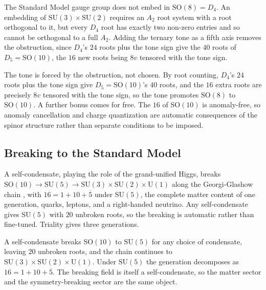 \begin{proposition}
The Standard Model gauge group does not embed in $\mathrm{SO}(8) = D_4$. An embedding of
$\mathrm{SU}(3) \times \mathrm{SU}(2)$ requires an $A_2$ root system with a root orthogonal to it, but every
$D_4$ root has exactly two non-zero entries and so cannot be orthogonal to a full $A_2$. Adding the ternary tone
as a fifth axis removes the obstruction, since $D_4$'s $24$ roots plus the tone sign give the $40$ roots of
$D_5 = \mathrm{SO}(10)$, the $16$ new roots being $8v$ tensored with the tone sign.
\end{proposition}

The tone is forced by the obstruction, not chosen. By root counting, $D_4$'s $24$ roots plus the tone sign give
$D_5 = \mathrm{SO}(10)$'s $40$ roots, and the $16$ extra roots are precisely $8v$ tensored with the tone sign, so
the tone promotes $\mathrm{SO}(8)$ to $\mathrm{SO}(10)$. A further bonus comes for free. The $16$ of
$\mathrm{SO}(10)$ is anomaly-free, so anomaly cancellation and charge quantization are automatic consequences of
the spinor structure rather than separate conditions to be imposed.

\subsection{Breaking to the Standard Model}

A self-condensate, playing the role of the grand-unified Higgs, breaks
$\mathrm{SO}(10) \to \mathrm{SU}(5) \to \mathrm{SU}(3) \times \mathrm{SU}(2) \times \mathrm{U}(1)$ along the
Georgi-Glashow chain \cite{georgiglashow1974, fritzschminkowski1975}, with $16 = 1 + 10 + \overline{5}$ under
$\mathrm{SU}(5)$, the complete matter content of one generation, quarks, leptons, and a right-handed neutrino.
Any self-condensate gives $\mathrm{SU}(5)$ with $20$ unbroken roots, so the breaking is automatic rather than
fine-tuned. Triality gives three generations.

\begin{proposition}
A self-condensate breaks $\mathrm{SO}(10)$ to $\mathrm{SU}(5)$ for any choice of condensate, leaving $20$
unbroken roots, and the chain continues to
$\mathrm{SU}(3) \times \mathrm{SU}(2) \times \mathrm{U}(1)$. Under $\mathrm{SU}(5)$ the generation decomposes as
$16 = 1 + 10 + \overline{5}$. The breaking field is itself a self-condensate, so the matter sector and the
symmetry-breaking sector are the same object.
\end{proposition}

